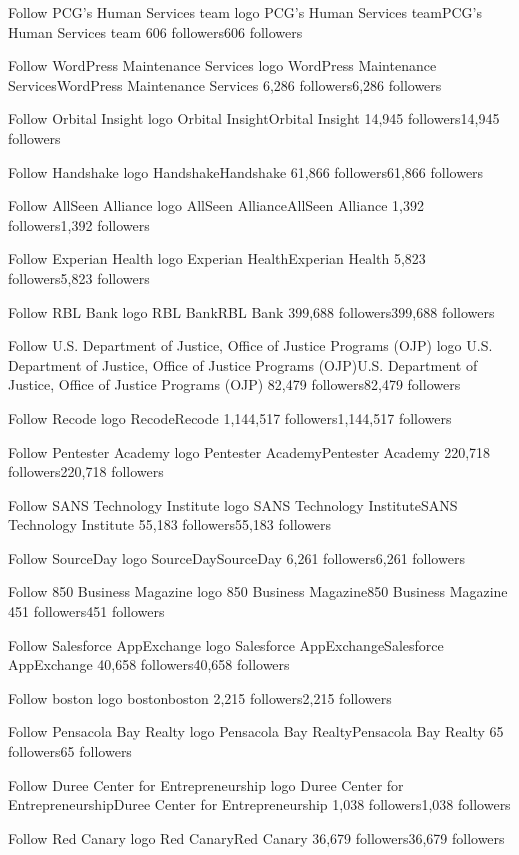 Follow
PCG’s Human Services team logo
PCG’s Human Services teamPCG’s Human Services team
606 followers606 followers

Follow
WordPress Maintenance Services logo
WordPress Maintenance ServicesWordPress Maintenance Services
6,286 followers6,286 followers

Follow
Orbital Insight logo
Orbital InsightOrbital Insight
14,945 followers14,945 followers

Follow
Handshake logo
HandshakeHandshake
61,866 followers61,866 followers

Follow
AllSeen Alliance logo
AllSeen AllianceAllSeen Alliance
1,392 followers1,392 followers

Follow
Experian Health logo
Experian HealthExperian Health
5,823 followers5,823 followers

Follow
RBL Bank logo
RBL BankRBL Bank
399,688 followers399,688 followers

Follow
U.S. Department of Justice, Office of Justice Programs (OJP) logo
U.S. Department of Justice, Office of Justice Programs (OJP)U.S. Department of Justice, Office of Justice Programs (OJP)
82,479 followers82,479 followers

Follow
Recode logo
RecodeRecode
1,144,517 followers1,144,517 followers

Follow
Pentester Academy logo
Pentester AcademyPentester Academy
220,718 followers220,718 followers

Follow
SANS Technology Institute logo
SANS Technology InstituteSANS Technology Institute
55,183 followers55,183 followers

Follow
SourceDay logo
SourceDaySourceDay
6,261 followers6,261 followers

Follow
850 Business Magazine logo
850 Business Magazine850 Business Magazine
451 followers451 followers

Follow
Salesforce AppExchange logo
Salesforce AppExchangeSalesforce AppExchange
40,658 followers40,658 followers

Follow
boston logo
bostonboston
2,215 followers2,215 followers

Follow
Pensacola Bay Realty logo
Pensacola Bay RealtyPensacola Bay Realty
65 followers65 followers

Follow
Duree Center for Entrepreneurship logo
Duree Center for EntrepreneurshipDuree Center for Entrepreneurship
1,038 followers1,038 followers

Follow
Red Canary logo
Red CanaryRed Canary
36,679 followers36,679 followers


